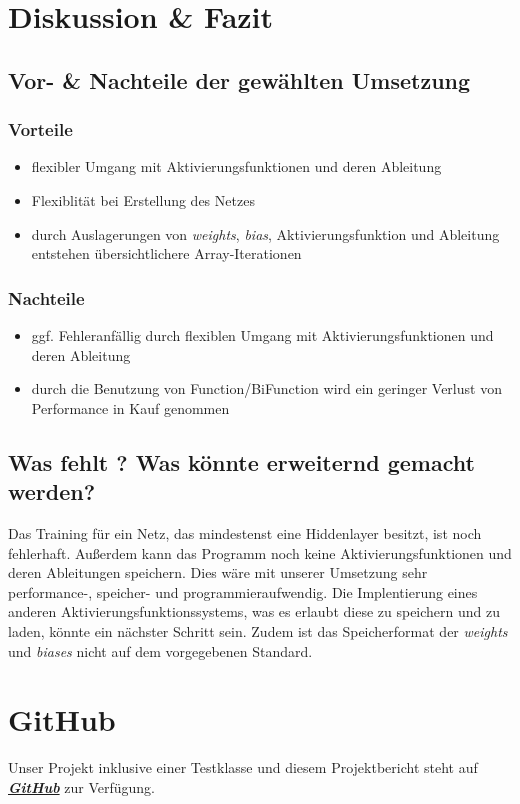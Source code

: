 \documentclass[paper=A4,pagesize=auto,12pt,headinclude=true,footinclude=true,BCOR=0mm,DIV=calc]{scrartcl}
\begin{document}
	\newpage
	
	\section{Diskussion \& Fazit}
	
	\subsection{Vor- \& Nachteile der gewählten Umsetzung}
	\subsubsection{Vorteile}
	\begin{itemize}
		\item flexibler Umgang mit Aktivierungsfunktionen und deren Ableitung
		\item Flexiblität bei Erstellung des Netzes
		\item durch Auslagerungen von \textit{weights}, \textit{bias}, Aktivierungsfunktion und Ableitung entstehen übersichtlichere Array-Iterationen
	\end{itemize}
	\subsubsection{Nachteile}
	\begin{itemize}
		\item ggf. Fehleranfällig durch flexiblen Umgang mit Aktivierungsfunktionen und deren Ableitung
		\item durch die Benutzung von Function/BiFunction wird ein geringer Verlust von Performance in Kauf genommen
	\end{itemize}
	\subsection{Was fehlt ? Was könnte erweiternd gemacht werden?}
	Das Training für ein Netz, das mindestenst eine Hiddenlayer besitzt, ist noch fehlerhaft. Außerdem kann das Programm noch keine Aktivierungsfunktionen und deren Ableitungen speichern.
	Dies wäre mit unserer Umsetzung sehr performance-, speicher- und programmieraufwendig. Die Implentierung eines anderen Aktivierungsfunktionssystems, was es erlaubt diese zu speichern und zu laden, könnte ein nächster Schritt sein.
	Zudem ist das Speicherformat der \textit{weights} und \textit{biases} nicht auf dem vorgegebenen Standard.
	\newpage
	
	\section{GitHub}
	Unser Projekt inklusive einer Testklasse und diesem Projektbericht steht auf \hyperref{https://github.com/Griszder/ProjektSeminar.git}{}{}{\textit{\textbf{GitHub}}} zur Verfügung.
	
\end{document}

